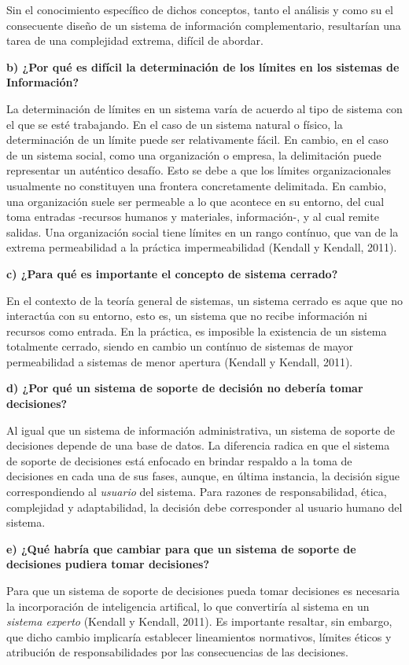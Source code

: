 \documentclass[12pt]{article}
\begin{document}
Sin el conocimiento específico de dichos conceptos, tanto el análisis y
como su el consecuente diseño de un sistema de información complementario,
resultarían una tarea de una complejidad extrema,
difícil de abordar.

\textbf{b) ¿Por qué es difícil la determinación de los límites en los sistemas de Información?}

La determinación de límites en un sistema varía de acuerdo al tipo de sistema
con el que se esté trabajando.
En el caso de un sistema natural o físico, la determinación de un límite
puede ser relativamente fácil.
En cambio, en el caso de un sistema social, como una organización o empresa,
la delimitación puede representar un auténtico desafío.
Esto se debe a que los límites organizacionales usualmente no constituyen
una frontera concretamente delimitada. En cambio,
una organización suele ser permeable a lo que acontece en su entorno,
del cual toma entradas -recursos humanos y materiales, información-,
y al cual remite salidas.
Una organización social tiene límites en un rango contínuo,
que van de la extrema permeabilidad a la práctica impermeabilidad (Kendall y Kendall, 2011).

\textbf{c) ¿Para qué es importante el concepto de sistema cerrado?}

En el contexto de la teoría general de sistemas,
un sistema cerrado es aque que no interactúa con su entorno,
esto es,
un sistema que no recibe información ni recursos como entrada.
En la práctica,
es imposible la existencia de un sistema totalmente cerrado,
siendo en cambio un contínuo de sistemas de mayor permeabilidad a sistemas de
menor apertura (Kendall y Kendall, 2011).

\textbf{d) ¿Por qué un sistema de soporte de decisión no debería tomar decisiones?}

Al igual que un sistema de información administrativa,
un sistema de soporte de decisiones depende de una base de datos.
La diferencia radica en que el sistema de soporte de decisiones está
enfocado en brindar respaldo a la toma de decisiones en cada una de sus fases,
aunque, en última instancia,
la decisión sigue correspondiendo al \textit{usuario} del sistema.
Para razones de responsabilidad, ética, complejidad y adaptabilidad,
la decisión debe corresponder al usuario humano del sistema.

\textbf{e) ¿Qué habría que cambiar para que un sistema de soporte de decisiones pudiera tomar decisiones? }

Para que un sistema de soporte de decisiones pueda tomar decisiones es necesaria
la incorporación de inteligencia artifical, lo que convertiría al sistema en
un \textit{sistema experto} (Kendall y Kendall, 2011).
Es importante resaltar, sin embargo, que dicho cambio implicaría
establecer lineamientos normativos, límites éticos y
atribución de responsabilidades
por las consecuencias de las decisiones.
\end{document}
